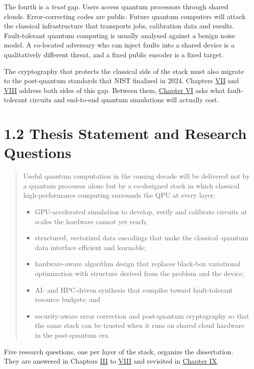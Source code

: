 \documentclass{report}
\theoremstyle{plain}
\theoremstyle{definition}
\theoremstyle{remark}
\begin{document}
The fourth is a \emph{trust} gap. Users access quantum processors through shared clouds. Error-correcting codes are public. Future quantum computers will attack the classical infrastructure that transports jobs, calibration data and results. Fault-tolerant quantum computing is usually analysed against a benign noise model. A co-located adversary who can inject faults into a shared device is a qualitatively different threat, and a fixed public encoder is a fixed target.

The cryptography that protects the classical side of the stack must also migrate to the post-quantum standards that NIST finalized in 2024. Chapters \hyperref[ch:qec]{VII} and \hyperref[ch:pqc]{VIII} address both sides of this gap. Between them, \hyperref[ch:synthesis]{Chapter VI} asks what fault-tolerant circuits and end-to-end quantum simulations will actually cost.

\section{1.2 Thesis Statement and Research Questions}\label{sec:intro:thesis}

\begin{quote}
Useful quantum computation in the coming decade will be delivered not by a quantum processor alone but by a co-designed stack in which classical high-performance computing surrounds the QPU at every layer:
\begin{itemize}
\item GPU-accelerated simulation to develop, verify and calibrate circuits at scales the hardware cannot yet reach;
\item structured, vectorized data encodings that make the classical--quantum data interface efficient and learnable;
\item hardware-aware algorithm design that replaces black-box variational optimization with structure derived from the problem and the device;
\item AI- and HPC-driven synthesis that compiles toward fault-tolerant resource budgets; and
\item security-aware error correction and post-quantum cryptography so that the same stack can be trusted when it runs on shared cloud hardware in the post-quantum era.
\end{itemize}
\end{quote}

Five research questions, one per layer of the stack, organize the dissertation. They are answered in Chapters \hyperref[ch:qgear]{III} to \hyperref[ch:pqc]{VIII} and revisited in \hyperref[ch:conclusion]{Chapter IX}.
\end{document}
